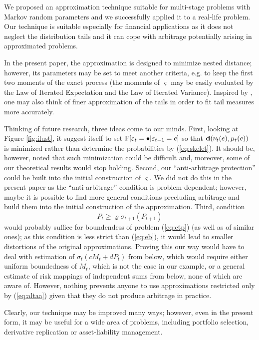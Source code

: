 \documentclass{article}              %
\begin{document}
We proposed an approximation technique suitable for multi-stage problems with Markov random parameters and we successfully applied it to a real-life problem. Our technique is suitable especially for financial applications as it does not neglect the distribution tails and it can cope with arbitrage potentially arising in approximated problems. 

In the present paper, the approximation is designed to minimize nested distance; however, its  parameters may be set to meet another criteria, e.g. to keep the first two moments of the exact process (the moments of $\varsigma$ may be easily evaluated by the Law of Iterated Expectation and the Law of Iterated Variance). Inspired by \cite{kozmik2014evaluating}, one may also think of finer approximation of the tails in order to fit tail measures more accurately. 

Thinking of future research, three ideas come to our minds. First, looking at Figure \ref{fig:ilust}, it suggest itself to set $\P[\varepsilon_{t}=\bullet|\varepsilon_{t-1}=e]$ so that $\d(\nu_{t}(e),\mu_t(e))$ is minimized rather than determine the probabilities by (\ref{eq:skelet}). It should be, however, noted that such minimization could be difficult and, moreover, some of our theoretical results would stop holding. Second, our ``anti-arbitrage protection'' could be built into the initial construction of $\varsigma$. We did not do this in the present paper as the ``anti-arbitrage'' condition is problem-dependent; however, maybe it is possible to find more general conditions precluding arbitrage and build them into the initial construction of the approximation. Third, condition 
\begin{equation}\label{eq:altaa}
P_t \geq \varrho \sigma_{t+1}(P_{t+1})
\end{equation}
 would probably suffice for boundendess of problem (\ref{eq:etp}) (as well as of similar ones); as this condition is less strict than (\ref{eq:eb}), it would lead to smaller distortions of the original approximations. Proving this our way would have to deal with estimation of $\sigma_t(cM_t+dP_t)$ from below, which would require either uniform boundedness of $M_t$, which is not the case in our example, or a general estimate of risk mappings of independent sums from below, none of which are aware of. However, nothing prevents anyone to use approximations restricted only by (\ref{eq:altaa}) given that they do not produce arbitrage in practice.
 
Clearly, our technique may be improved many ways; however, even in the present form, it may be useful for a wide area of problems, including portfolio selection, derivative replication or asset-liability management. 
\end{document}
